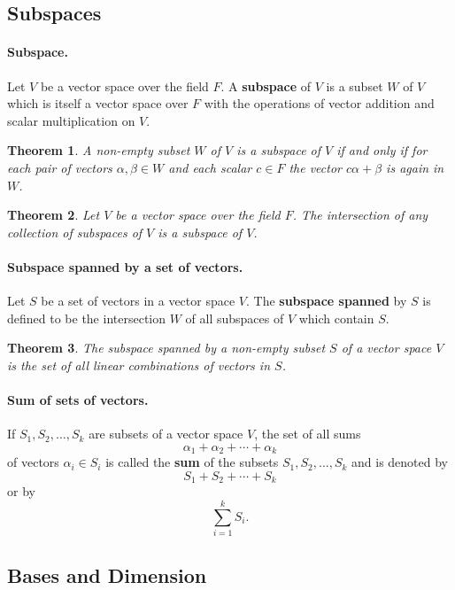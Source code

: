 \documentclass{article}
\newtheorem{theorem}{Theorem}
\begin{document}
\subsection{Subspaces}

\paragraph{Subspace.} Let $V$ be a vector space over the field $F$. A
\textbf{subspace} of $V$ is a subset $W$ of $V$ which is itself a vector space
over $F$ with the operations of vector addition and scalar multiplication on
$V$.

\setcounter{theorem}{0}
\begin{theorem}
  A non-empty subset $W$ of $V$ is a subspace of $V$ if and only if for each
  pair of vectors $\alpha, \beta \in W$ and each scalar $c \in F$ the vector
  $c\alpha + \beta$ is again in $W$.
\end{theorem}

\begin{theorem}
  Let $V$ be a vector space over the field $F$. The intersection of any
  collection of subspaces of $V$ is a subspace of $V$.
\end{theorem}

\paragraph{Subspace spanned by a set of vectors.} Let $S$ be a set of vectors
in a vector space $V$. The \textbf{subspace spanned} by $S$ is defined to be
the intersection $W$ of all subspaces of $V$ which contain $S$.

\begin{theorem}
  The subspace spanned by a non-empty subset $S$ of a vector space $V$ is the
  set of all linear combinations of vectors in $S$.
\end{theorem}

\paragraph{Sum of sets of vectors.} If $S_1, S_2, \ldots, S_k$ are subsets of a
vector space $V$, the set of all sums \[
  \alpha_1 + \alpha_2 + \cdots + \alpha_k
\] of vectors $\alpha_i \in S_i$ is called the \textbf{sum} of the subsets $S_1,
S_2, \ldots, S_k$ and is denoted by \[
  S_1 + S_2 + \cdots + S_k
\] or by \[
  \sum_{i=1}^k S_i.
\]

\subsection{Bases and Dimension}
\end{document}
